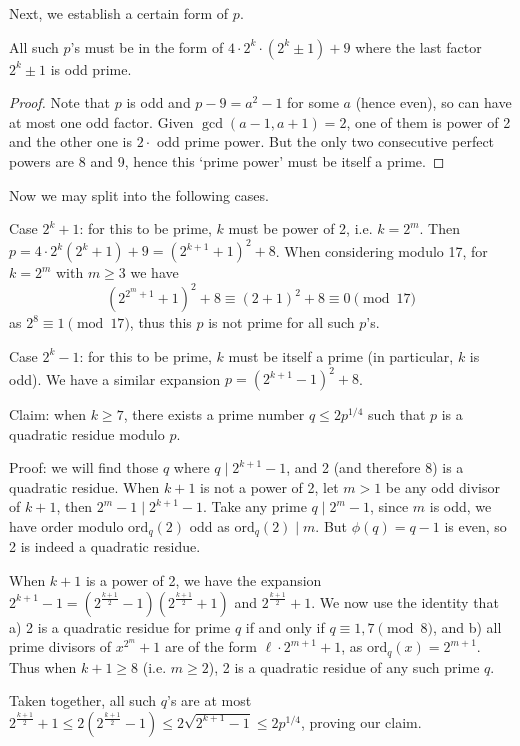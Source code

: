 \documentclass[11pt,a4paper]{article}
\begin{document}
\begin{enumerate}
        Next, we establish a certain form of $p$. 
        
        \begin{lemma}
        	All such $p$'s must be in the form of $4\cdot 2^k\cdot (2^k\pm 1) + 9$ where the last factor $2^k\pm 1$ is odd prime. 
        \end{lemma}
    
        \begin{proof}
        	Note that $p$ is odd and $p - 9 = a^2 - 1$ for some $a$ (hence even), 
        	so can have at most one odd factor. 
        	Given $\gcd(a-1, a+1)=2$, one of them is power of 2 and the other one is $2\cdot$ odd prime power. 
        	But the only two consecutive perfect powers are 8 and 9, 
        	hence this `prime power' must be itself a prime. 
        \end{proof}
    	
    	Now we may split into the following cases. 
    	
    	Case $2^k + 1$: for this to be prime, $k$ must be power of 2, i.e. $k = 2^m$. 
    	Then $p = 4\cdot 2^k (2^k + 1) + 9 = (2^{k + 1} + 1)^2 + 8$. 
    	When considering modulo 17, 
    	for $k = 2^m$ with $m\ge 3$ we have 
    	\[
    	(2^{2^m+1} + 1)^2 + 8\equiv (2 + 1)^2+8\equiv 0\pmod{17}
    	\]
    	as $2^8\equiv 1\pmod{17}$, thus this $p$ is not prime for all such $p$'s. 
    	
    	Case $2^k - 1$: for this to be prime, $k$ must be itself a prime (in particular, $k$ is odd). 
    	We have a similar expansion $p = (2^{k+1}-1)^2+8$. 
    	
    	Claim: when $k\ge 7$, there exists a prime number $q\le 2p^{1/4}$ such that $p$ is a quadratic residue modulo $p$. 
    	
    	Proof: we will find those $q$ where $q\mid 2^{k+1}-1$, and 2 (and therefore 8) is a quadratic residue. 
    	When $k + 1$ is not a power of 2, let $m > 1$ be any odd divisor of $k + 1$, then $2^m-1 \mid 2^{k+1}-1$. 
    	Take any prime $q\mid 2^m - 1$, since $m$ is odd, we have order modulo $\text{ord}_q(2)$ odd as $\text{ord}_q(2)\mid m$. 
    	But $\phi(q)=q-1$ is even, so 2 is indeed a quadratic residue. 
    	
    	When $k+1$ is a power of 2, 
    	we have the expansion $2^{k+1}-1 = (2^{\frac{k+1}{2}} - 1)(2^{\frac{k+1}{2}} + 1)$ and $2^{\frac{k+1}{2}} + 1$. 
    	We now use the identity that a) 2 is a quadratic residue for prime $q$ if and only if $q\equiv 1, 7\pmod{8}$, 
    	and b) all prime divisors of $x^{2^m}+1$ are of the form $\ell \cdot 2^{m+1} + 1$, 
    	as $\text{ord}_q (x)=2^{m+1}$. 
    	Thus when $k+1\ge 8$ (i.e. $m\ge 2$), 2 is a quadratic residue of any such prime $q$. 
    	
    	Taken together, all such $q$'s are at most $2^{\frac{k+1}{2}} + 1\le 2(2^{\frac{k+1}{2}} - 1)\le 2\sqrt{2^{k + 1} - 1}\le 2p^{1/4}$, 
    	proving our claim. 
    	
    	
    \end{enumerate}
\end{document}

